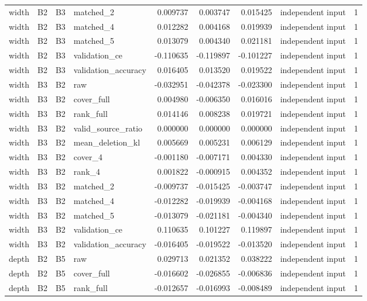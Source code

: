 \begin{tabular}{llllrrrlr}
width & B2 & B3 & matched_2 & 0.009737 & 0.003747 & 0.015425 & independent input & 1 \\
width & B2 & B3 & matched_4 & 0.012282 & 0.004168 & 0.019939 & independent input & 1 \\
width & B2 & B3 & matched_5 & 0.013079 & 0.004340 & 0.021181 & independent input & 1 \\
width & B2 & B3 & validation_ce & -0.110635 & -0.119897 & -0.101227 & independent input & 1 \\
width & B2 & B3 & validation_accuracy & 0.016405 & 0.013520 & 0.019522 & independent input & 1 \\
width & B3 & B2 & raw & -0.032951 & -0.042378 & -0.023300 & independent input & 1 \\
width & B3 & B2 & cover_full & 0.004980 & -0.006350 & 0.016016 & independent input & 1 \\
width & B3 & B2 & rank_full & 0.014146 & 0.008238 & 0.019721 & independent input & 1 \\
width & B3 & B2 & valid_source_ratio & 0.000000 & 0.000000 & 0.000000 & independent input & 1 \\
width & B3 & B2 & mean_deletion_kl & 0.005669 & 0.005231 & 0.006129 & independent input & 1 \\
width & B3 & B2 & cover_4 & -0.001180 & -0.007171 & 0.004330 & independent input & 1 \\
width & B3 & B2 & rank_4 & 0.001822 & -0.000915 & 0.004352 & independent input & 1 \\
width & B3 & B2 & matched_2 & -0.009737 & -0.015425 & -0.003747 & independent input & 1 \\
width & B3 & B2 & matched_4 & -0.012282 & -0.019939 & -0.004168 & independent input & 1 \\
width & B3 & B2 & matched_5 & -0.013079 & -0.021181 & -0.004340 & independent input & 1 \\
width & B3 & B2 & validation_ce & 0.110635 & 0.101227 & 0.119897 & independent input & 1 \\
width & B3 & B2 & validation_accuracy & -0.016405 & -0.019522 & -0.013520 & independent input & 1 \\
depth & B2 & B5 & raw & 0.029713 & 0.021352 & 0.038222 & independent input & 1 \\
depth & B2 & B5 & cover_full & -0.016602 & -0.026855 & -0.006836 & independent input & 1 \\
depth & B2 & B5 & rank_full & -0.012657 & -0.016993 & -0.008489 & independent input & 1 \\

\end{tabular}
